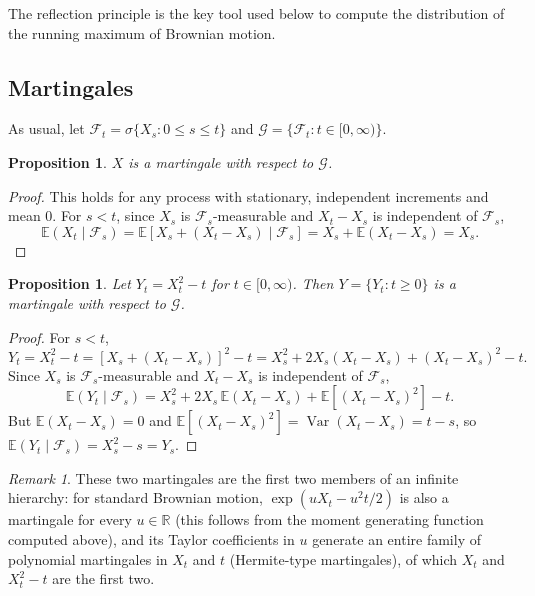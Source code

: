 \documentclass[12pt,openany]{book}
\newtheorem{proposition}[theorem]{Proposition}
\theoremstyle{definition}
\theoremstyle{remark}
\newtheorem{remark}[theorem]{Remark}
\newcommand{\R}{\mathbb{R}}
\newcommand{\E}{\mathbb{E}}
\newcommand{\Fscr}{\mathcal{F}}
\newcommand{\Gscr}{\mathcal{G}}
\DeclareMathOperator{\Var}{Var}
\begin{document}
The reflection principle is the key tool used below to compute the distribution of the running maximum of Brownian motion.
 
\subsection{Martingales}
 
As usual, let $\Fscr_t = \sigma\{X_s : 0\le s \le t\}$ and $\Gscr = \{\Fscr_t : t \in [0,\infty)\}$.
 
\begin{proposition}
$X$ is a martingale with respect to $\Gscr$.
\end{proposition}
\begin{proof}
This holds for any process with stationary, independent increments and mean $0$. For $s<t$, since $X_s$ is $\Fscr_s$-measurable and $X_t - X_s$ is independent of $\Fscr_s$,
\begin{equation}
    \E(X_t \mid \Fscr_s) = \E[X_s + (X_t - X_s) \mid \Fscr_s] = X_s + \E(X_t - X_s) = X_s. \tag{18.1.17}
\end{equation}
\end{proof}
 
\begin{proposition}
Let $Y_t = X_t^2 - t$ for $t \in [0,\infty)$. Then $Y = \{Y_t : t \ge 0\}$ is a martingale with respect to $\Gscr$.
\end{proposition}
\begin{proof}
For $s<t$,
\begin{equation}
    Y_t = X_t^2 - t = [X_s + (X_t-X_s)]^2 - t = X_s^2 + 2X_s(X_t-X_s) + (X_t-X_s)^2 - t. \tag{18.1.18}
\end{equation}
Since $X_s$ is $\Fscr_s$-measurable and $X_t-X_s$ is independent of $\Fscr_s$,
\begin{equation}
    \E(Y_t \mid \Fscr_s) = X_s^2 + 2X_s\,\E(X_t-X_s) + \E[(X_t-X_s)^2] - t. \tag{18.1.19}
\end{equation}
But $\E(X_t-X_s)=0$ and $\E[(X_t-X_s)^2] = \Var(X_t-X_s) = t-s$, so $\E(Y_t \mid \Fscr_s) = X_s^2 - s = Y_s$.
\end{proof}
 
\begin{remark}
These two martingales are the first two members of an infinite hierarchy: for standard Brownian motion, $\exp(uX_t - u^2t/2)$ is also a martingale for every $u \in \R$ (this follows from the moment generating function computed above), and its Taylor coefficients in $u$ generate an entire family of polynomial martingales in $X_t$ and $t$ (Hermite-type martingales), of which $X_t$ and $X_t^2-t$ are the first two.
\end{remark}
 
\end{document}
